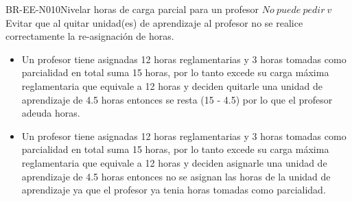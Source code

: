 \begin{BusinessRule}{BR-EE-N010}{Nivelar horas de carga parcial para un profesor}
	$No\ puede\ pedir\ v$ \\
	\BRItem[Motivación] Evitar que al quitar unidad(es) de aprendizaje al profesor no se realice correctamente la re-asignación de horas. \\
		 \cdtEmpty
		\begin{itemize}
			\item Un profesor tiene asignadas 12 horas reglamentarias y 3 horas tomadas como parcialidad en total suma 15 horas, por lo tanto excede su carga máxima reglamentaria que equivale a 12 horas y deciden quitarle una unidad de aprendizaje de 4.5 horas entonces se resta (15 - 4.5) por lo que el profesor adeuda horas. 
		\end{itemize}
		 \cdtEmpty
		\begin{itemize}
			\item Un profesor tiene asignadas 12 horas reglamentarias y 3 horas tomadas como parcialidad en total suma 15 horas, por lo tanto excede su carga máxima reglamentaria que equivale a 12 horas y deciden asignarle una unidad de aprendizaje de 4.5 horas entonces no se asignan las horas de la unidad de aprendizaje ya que el profesor ya tenia horas tomadas como parcialidad. 	
		\end{itemize}
\end{BusinessRule}

